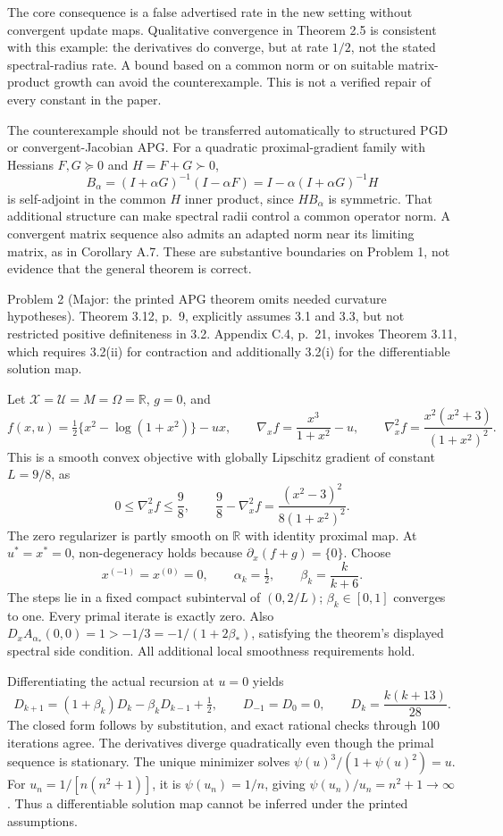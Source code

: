 \documentclass[10pt]{article}
\begin{document}
The core consequence is a false advertised rate in the new setting without convergent update maps. Qualitative convergence in Theorem 2.5 is consistent with this example: the derivatives do converge, but at rate \(1/2\), not the stated spectral-radius rate. A bound based on a common norm or on suitable matrix-product growth can avoid the counterexample. This is not a verified repair of every constant in the paper.\par
The counterexample should not be transferred automatically to structured PGD or convergent-Jacobian APG. For a quadratic proximal-gradient family with Hessians \(F,G\succeq0\) and \(H=F+G\succ0\), \[B_\alpha=(I+\alpha G)^{-1}(I-\alpha F)
          =I-\alpha(I+\alpha G)^{-1}H\] is self-adjoint in the common \(H\) inner product, since \(HB_\alpha\) is symmetric. That additional structure can make spectral radii control a common operator norm. A convergent matrix sequence also admits an adapted norm near its limiting matrix, as in Corollary A.7. These are substantive boundaries on Problem 1, not evidence that the general theorem is correct.\par
Problem 2 (Major: the printed APG theorem omits needed curvature hypotheses).  Theorem 3.12, p. 9, explicitly assumes 3.1 and 3.3, but not restricted positive definiteness in 3.2. Appendix C.4, p. 21, invokes Theorem 3.11, which requires 3.2(ii) for contraction and additionally 3.2(i) for the differentiable solution map.\par
Let \(\mathcal X=\mathcal U=M=\Omega=\mathbb R\), \(g=0\), and \[f(x,u)=\tfrac12\{x^2-\log(1+x^2)\}-ux,\qquad
 \nabla_x f=\frac{x^3}{1+x^2}-u,\qquad
 \nabla_x^2f=\frac{x^2(x^2+3)}{(1+x^2)^2}.\] This is a smooth convex objective with globally Lipschitz gradient of constant \(L=9/8\), as \[0\le \nabla_x^2f\le\frac98,\qquad
 \frac98-\nabla_x^2f=\frac{(x^2-3)^2}{8(1+x^2)^2}.\] The zero regularizer is partly smooth on \(\mathbb R\) with identity proximal map. At \(u^*=x^*=0\), non-degeneracy holds because \(\partial_x(f+g)=\{0\}\). Choose \[x^{(-1)}=x^{(0)}=0,\qquad \alpha_k=\tfrac12,\qquad
 \beta_k=\frac{k}{k+6}.\] The steps lie in a fixed compact subinterval of \((0,2/L)\); \(\beta_k\in[0,1]\) converges to one. Every primal iterate is exactly zero. Also \(D_xA_{\alpha_*}(0,0)=1>-1/3=-1/(1+2\beta_*)\), satisfying the theorem’s displayed spectral side condition. All additional local smoothness requirements hold.\par
Differentiating the actual recursion at \(u=0\) yields \[D_{k+1}=(1+\beta_k)D_k-\beta_kD_{k-1}+\tfrac12,\qquad
 D_{-1}=D_0=0,\qquad
 D_k=\frac{k(k+13)}{28}.\] The closed form follows by substitution, and exact rational checks through 100 iterations agree. The derivatives diverge quadratically even though the primal sequence is stationary. The unique minimizer solves \(\psi(u)^3/(1+\psi(u)^2)=u\). For \(u_n=1/[n(n^2+1)]\), it is \(\psi(u_n)=1/n\), giving \(\psi(u_n)/u_n=n^2+1\to\infty\). Thus a differentiable solution map cannot be inferred under the printed assumptions.\par
\end{document}
